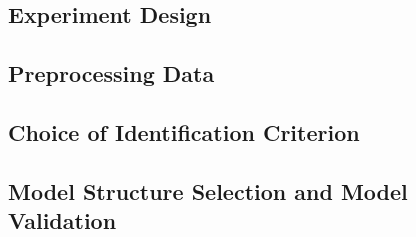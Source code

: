 \subsection{Experiment Design}

\subsection{Preprocessing Data}

\subsection{Choice of Identification Criterion}

\subsection{Model Structure Selection and Model Validation}





